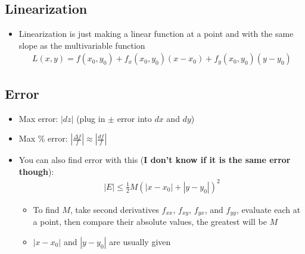 \documentclass{article}
\begin{document}
\subsection{Linearization}
\begin{itemize}
  \item Linearization is just making a linear function at a point and with the same slope as the multivariable function
  \begin{align}
    L(x,y) = f(x_0,y_0) + f_x(x_0,y_0)(x - x_0) + f_y(x_0,y_0)(y - y_0)
  \end{align}
\end{itemize}

\subsection{Error}
\begin{itemize}
  \item Max error: $|dz|$ (plug in $\pm$ error into $dx$ and $dy$)
  \item Max \% error: $\left| \frac{\Delta f}{f} \right| \approx \left| \frac{df}{f} \right|$
  \item You can also find error with this (\textbf{I don't know if it is the same error though}):
  \begin{align}
    |E| \leq \frac{1}{2}M\left( |x - x_0| + |y - y_0| \right)^2
  \end{align}
    \begin{itemize}
      \item To find $M$, take second derivatives $f_{xx}$, $f_{xy}$, $f_{yx}$, and $f_{yy}$, evaluate each at a point, then compare their absolute values, the greatest will be $M$
      \item $|x - x_0|$ and $|y - y_0|$ are usually given
    \end{itemize}
\end{itemize}
\end{document}
